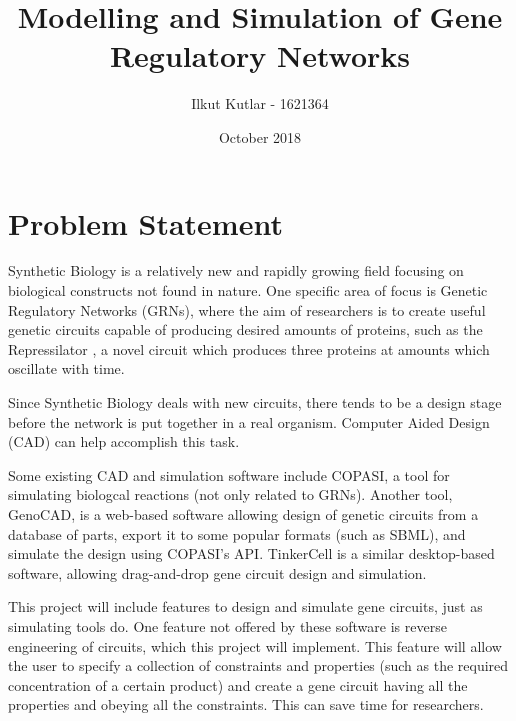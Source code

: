 \documentclass{article}
\title{Modelling and Simulation of Gene Regulatory Networks}
\author{Ilkut Kutlar - 1621364}
\date{October 2018}
\begin{document}
	\maketitle
	
	\section{Problem Statement}
	
	\par Synthetic Biology is a relatively new and rapidly growing field focusing on biological constructs not found in nature. One specific area of focus is Genetic Regulatory Networks (GRNs), where the aim of researchers is to create useful genetic circuits capable of producing desired amounts of proteins, such as the Repressilator \cite{repressilator}, a novel circuit which produces three proteins at amounts which oscillate with time.
	\par Since Synthetic Biology deals with new circuits, there tends to be a design stage before the network is put together in a real organism. Computer Aided Design (CAD) can help accomplish this task.
	\par Some existing CAD and simulation software include COPASI\cite{copasi}, a tool for simulating biologcal reactions (not only related to GRNs). Another tool, GenoCAD\cite{genocad}, is a web-based software allowing design of genetic circuits from a database of parts, export it to some popular formats (such as SBML), and simulate the design using COPASI's API. TinkerCell\cite{tinkercell} is a similar desktop-based software, allowing drag-and-drop gene circuit design and simulation.
	\par This project will include features to design and simulate gene circuits, just as simulating tools do. One feature not offered by these software is reverse engineering of circuits, which this project will implement. This feature will allow the user to specify a collection of constraints and properties (such as the required concentration of a certain product) and create a gene circuit having all the properties and obeying all the constraints. This can save time for researchers.
	
	
	
	
\end{document}
